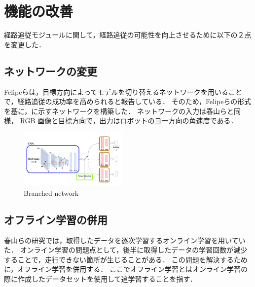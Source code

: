 \documentclass[10pt]{jarticle}
\begin{document}
    \section{機能の改善}%
    経路追従モジュールに関して，経路追従の可能性を向上させるために以下の２点を変更した．
    \subsection{ネットワークの変更}
    Felipeら\cite{Codevilla2018}は，目標方向によってモデルを切り替えるネットワークを用いることで，経路追従の成功率を高められると報告している．
    そのため，Felipeらの形式を基に，に示すネットワークを構築した．
    ネットワークの入力は春山らと同様， RGB 画像と目標方向で，出力はロボットのヨー方向の角速度である．
    \vspace{-1zh}
    \begin{center}
        \begin{figure}[h]
            \includegraphics[width=0.475\textwidth]{./fig/ishiguro/branched.pdf}
            \vspace{-2zh}
            \caption{Branched network}
            \label{fig:branched}
        \end{figure}
    \end{center}
    \vspace{-3zh}

    \subsection{オフライン学習の併用}
    春山らの研究では，取得したデータを逐次学習するオンライン学習を用いていた．
    オンライン学習の問題点として，後半に取得したデータの学習回数が減少することで，走行できない箇所が生じることがある．
    この問題を解決するために，オフライン学習を併用する．
    ここでオフライン学習とはオンライン学習の際に作成したデータセットを使用して追学習することを指す．
\end{document}

